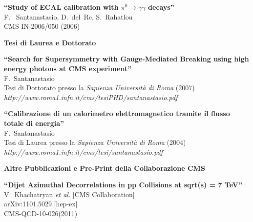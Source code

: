 \documentclass[10pt, a4paper]{article}
\begin{document}
\begin{thebibliography}{599}
{\bf ``Study of ECAL calibration with $\pi^0 \rightarrow \gamma \gamma$ decays''}
  \\{}F. ~Santanastasio, D.~del~Re, S.~Rahatlou
  \\{}CMS IN-2006/050 (2006)

\vspace{0.1cm} \begin{center} \textbf{Tesi di Laurea e Dottorato} \end{center} \vspace{0.05cm}

{\bf ``Search for Supersymmetry with Gauge-Mediated Breaking using high energy photons at CMS experiment''}
  \\{}F.~Santanastasio
  \\{}Tesi di Dottorato presso la \textit{Sapienza Universit\`a di Roma} (2007)
\\{}{\it http://www.roma1.infn.it/cms/tesiPHD/santanastasio.pdf}

{\bf ``Calibrazione di un calorimetro elettromagnetico tramite il flusso totale di energia''}
  \\{}F.~Santanastasio
  \\{}Tesi di Laurea presso la \textit{Sapienza Universit\`a di Roma} (2004)
\\{}{\it http://www.roma1.infn.it/cms/tesi/santanastasio.pdf }


\vspace{0.1cm} \begin{center} \textbf{Altre Pubblicazioni e Pre-Print della Collaborazione CMS} \end{center} \vspace{0.05cm}

{\bf ``Dijet Azimuthal Decorrelations in pp Collisions at sqrt(s) = 7 TeV''}
  \\{}V.~Khachatryan {\it et al.}  [CMS Collaboration]
  \\{}arXiv:1101.5029 [hep-ex]
\\{}CMS-QCD-10-026(2011)


\end{thebibliography}
\end{document}
